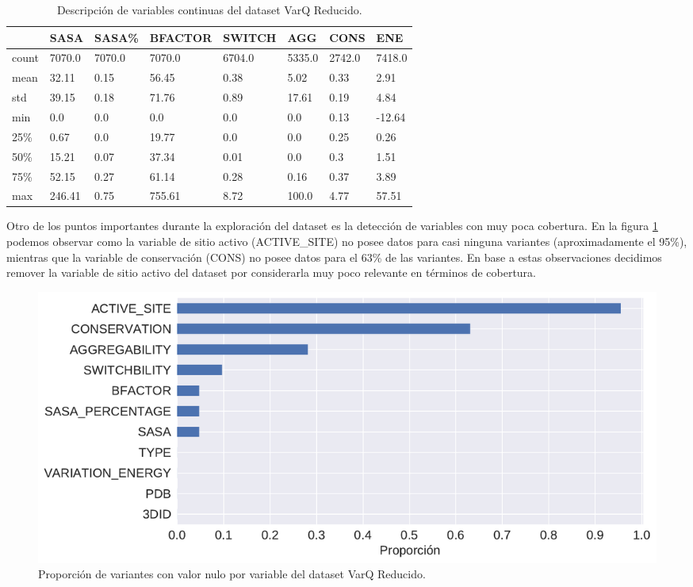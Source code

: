\begin{table}[H]
\centering
\begin{tabular}{|l|l|l|l|l|l|l|l|}
\hline
 & SASA & SASA\% & BFACTOR & SWITCH & AGG & CONS & ENE \\ \hline
count & 7070.0 & 7070.0 & 7070.0 & 6704.0 & 5335.0 & 2742.0 & 7418.0 \\ \hline
mean & 32.11 & 0.15 & 56.45 & 0.38 & 5.02 & 0.33 & 2.91 \\ \hline
std & 39.15 & 0.18 & 71.76 & 0.89 & 17.61 & 0.19 & 4.84 \\ \hline
min & 0.0 & 0.0 & 0.0 & 0.0 & 0.0 & 0.13 & -12.64 \\ \hline
25\% & 0.67 & 0.0 & 19.77 & 0.0 & 0.0 & 0.25 & 0.26 \\ \hline
50\% & 15.21 & 0.07 & 37.34 & 0.01 & 0.0 & 0.3 & 1.51 \\ \hline
75\% & 52.15 & 0.27 & 61.14 & 0.28 & 0.16 & 0.37 & 3.89 \\ \hline
max & 246.41 & 0.75 & 755.61 & 8.72 & 100.0 & 4.77 & 57.51 \\ \hline
\end{tabular}
\caption{Descripción de variables continuas del dataset VarQ Reducido.}
\label{tab:descripcion_varq}
\end{table}

Otro de los puntos importantes durante la exploración del dataset es la detección de variables con muy poca cobertura. En la figura \ref{fig:proporcion_nulos_varq} podemos observar como la variable de sitio activo (ACTIVE\_SITE) no posee datos para casi ninguna variantes (aproximadamente el 95\%), mientras que la variable de conservación (CONS) no posee datos para el 63\% de las variantes. En base a estas observaciones decidimos remover la variable de sitio activo del dataset por considerarla muy poco relevante en términos de cobertura.

\begin{figure}[H]
    \centering
    \includegraphics[scale=0.55]{documents/latex/figures/3/proporcion_nulos.pdf}
    \caption{Proporción de variantes con valor nulo por variable del dataset VarQ Reducido.}
    \label{fig:proporcion_nulos_varq}
\end{figure}

